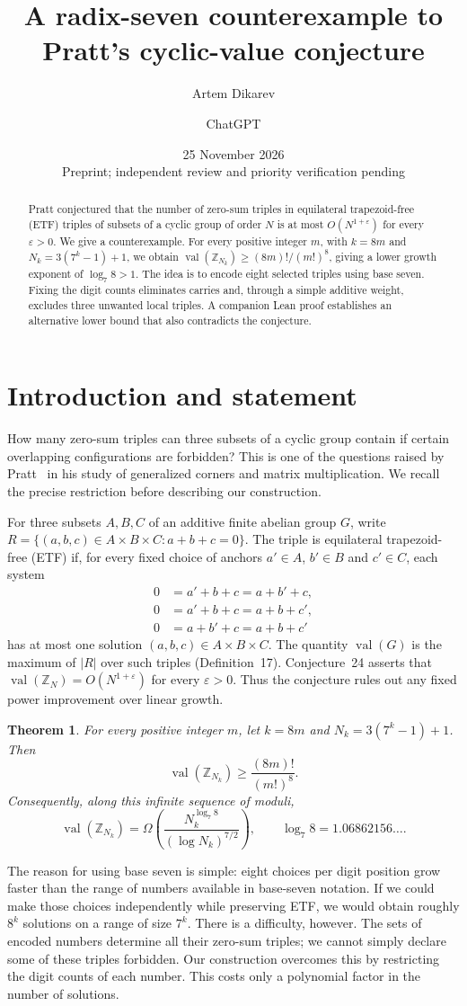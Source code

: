 \documentclass[11pt,a4paper]{article}
\title{A radix-seven counterexample to Pratt's cyclic-value conjecture}
\author{Artem Dikarev \and ChatGPT}
\date{25 November 2026\\\small Preprint; independent review and priority verification pending}
\newtheorem{theorem}{Theorem}
\newcommand{\val}{\operatorname{val}}
\newcommand{\Z}{\mathbb Z}
\begin{document}
\maketitle
\begin{abstract}
Pratt conjectured that the number of zero-sum triples in equilateral trapezoid-free (ETF) triples of subsets of a cyclic group of order $N$ is at most $O(N^{1+\varepsilon})$ for every $\varepsilon>0$. We give a counterexample. For every positive integer $m$, with $k=8m$ and $N_k=3(7^k-1)+1$, we obtain $\val(\Z_{N_k})\ge (8m)!/(m!)^8$, giving a lower growth exponent of $\log_7 8>1$. The idea is to encode eight selected triples using base seven. Fixing the digit counts eliminates carries and, through a simple additive weight, excludes three unwanted local triples. A companion Lean proof establishes an alternative lower bound that also contradicts the conjecture.
\end{abstract}
\section{Introduction and statement}
How many zero-sum triples can three subsets of a cyclic group contain if certain overlapping configurations are forbidden? This is one of the questions raised by Pratt~\cite{pratt} in his study of generalized corners and matrix multiplication. We recall the precise restriction before describing our construction.

For three subsets $A,B,C$ of an additive finite abelian group $G$, write $R=\{(a,b,c)\in A\times B\times C:a+b+c=0\}$. The triple is equilateral trapezoid-free (ETF) if, for every fixed choice of anchors $a'\in A$, $b'\in B$ and $c'\in C$, each system
\[
\begin{aligned}
0&=a'+b+c=a+b'+c,\\
0&=a'+b+c=a+b+c',\\
0&=a+b'+c=a+b+c'
\end{aligned}
\]
has at most one solution $(a,b,c)\in A\times B\times C$. The quantity $\val(G)$ is the maximum of $|R|$ over such triples (Definition~17). Conjecture~24 asserts that $\val(\Z_N)=O(N^{1+\varepsilon})$ for every $\varepsilon>0$. Thus the conjecture rules out any fixed power improvement over linear growth.
\begin{theorem}\label{thm:main}
For every positive integer $m$, let $k=8m$ and $N_k=3(7^k-1)+1$. Then
\[
\val(\Z_{N_k})\ge \frac{(8m)!}{(m!)^8}.
\]
Consequently, along this infinite sequence of moduli,
\[
\val(\Z_{N_k})=\Omega\left(\frac{N_k^{\log_7 8}}{(\log N_k)^{7/2}}\right),
\qquad \log_7 8=1.06862156\ldots .
\]
\end{theorem}
The reason for using base seven is simple: eight choices per digit position grow faster than the range of numbers available in base-seven notation. If we could make those choices independently while preserving ETF, we would obtain roughly $8^k$ solutions on a range of size $7^k$. There is a difficulty, however. The sets of encoded numbers determine all their zero-sum triples; we cannot simply declare some of these triples forbidden. Our construction overcomes this by restricting the digit counts of each number. This costs only a polynomial factor in the number of solutions.
\end{document}
